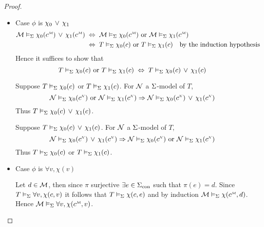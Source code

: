 \begin{proof}
\begin{itemize}
        \item Case $\phi$ is $\chi_0 \, \lor \, \chi_1$
            \begin{align*}
                \MM \model{\Si} \chi_0(\mmintp{c}) \OR \chi_1(\mmintp{c}) 
                    &\;\iff\; \MM \model{\Si} \chi_0(\mmintp{c}) 
                    \text{ or } \MM \model{\Si} \chi_1(\mmintp{c}) \\
                    &\;\iff\; T \model{\Si} \chi_0(c) \text{ or } 
                    T \model{\Si} \chi_1(c) 
                    \text{\quad by the induction hypothesis}
            \end{align*}
            Hence it suffices to show that 
            \[T \vDash_{\Sigma} \chi_0(c) \text{ or } T \vDash_{\Sigma} \chi_1(c) 
            \;\Leftrightarrow\; T \vDash_{\Sigma} \chi_0(c) \, \lor \, \chi_1(c)\]
            \begin{forward}
                Suppose $T \vDash_{\Sigma} \chi_0(c)$ or 
                $T \vDash_{\Sigma} \chi_1(c)$.
                For $\mathcal{N}$ a $\Sigma$-model of $T$,
                \[
                    \NN \model{\Si} \chi_0(\nnintp{c}) \text{ or } 
                    \NN \model{\Si} \chi_1(\nnintp{c}) 
                    \implies \NN \model{\Si} \chi_0(\nnintp{c}) 
                    \OR \chi_1(\nnintp{c})
                \]
                Thus $T \vDash_{\Sigma} \chi_0(c) \, \lor \, \chi_1(c)$.
            \end{forward}

            \begin{backward}
                Suppose $T \vDash_{\Sigma} \chi_0(c) \, \lor \, \chi_1(c)$.
                For $\mathcal{N}$ a $\Sigma$-model of $T$,
                \[
                    \NN \model{\Si} \chi_0(\nnintp{c}) 
                    \OR \chi_1(\nnintp{c}) 
                    \implies
                    \NN \model{\Si} \chi_0(\nnintp{c}) \text{ or } 
                    \NN \model{\Si} \chi_1(\nnintp{c}) 
                \]
                Thus $T \vDash_{\Sigma} \chi_0(c)$ or $T \vDash_{\Sigma} \chi_1(c)$.
            \end{backward}

        \item Case $\phi$ is $\forall v, \chi(v)$
            \begin{forward}
                Let $d \in {\mathcal{M}}$, 
                then since $\pi$ surjective $\exists e \in {\Sigma}_\mathrm{con}$
                such that $\pi(e) = d$.
                Since $T \vDash_{\Sigma} \forall v, \chi(c,v)$ 
                it follows that $T \vDash_{\Sigma} \chi(c,e)$
                and by induction $\MM \model{\Si} \chi(\mmintp{c},d)$.
                Hence $\MM \model{\Si} \forall v, \chi(\mmintp{c},v)$.
            \end{forward}


\end{itemize}
\end{proof}
